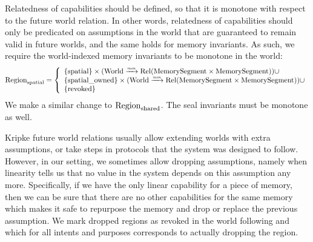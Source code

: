 \begin{jversion}
Relatedness of capabilities should be defined, so that it is monotone with respect to the future world relation.
In other words, relatedness of capabilities should only be predicated on assumptions in the world that are guaranteed to remain valid in future worlds, and the same holds for memory invariants.
As such, we require the world-indexed memory invariants to be monotone in the world:
\[
  \mathrm{Region}_\mathrm{spatial} = \left\{
  \begin{array}{l}
    \{\mathrm{spatial} \} \times (\mathrm{World} \xrightarrow{\textit{\tiny{mon}}} \mathrm{Rel}(\mathrm{MemorySegment} \times \mathrm{MemorySegment})) \cup \\
    \{\mathrm{spatial\_owned} \} \times (\mathrm{World} \xrightarrow{\textit{\tiny{mon}}} \mathrm{Rel}(\mathrm{MemorySegment} \times \mathrm{MemorySegment})) \cup \\
    \{\mathrm{revoked} \}
  \end{array} \right.
\]
We make a similar change to $\mathrm{Region}_\mathrm{shared}$. The seal invariants must be monotone as well.

Kripke future world relations usually allow extending worlds with extra assumptions, or take steps in protocols that the system was designed to follow.
However, in our setting, we sometimes allow dropping assumptions, namely when linearity tells us that no value in the system depends on this assumption any more.
Specifically, if we have the only linear capability for a piece of memory, then we can be sure that there are no other capabilities for the same memory which makes it safe to repurpose the memory and drop or replace the previous assumption.
We mark dropped regions as revoked in the world following \citet{ahmed_2004} and \citet{thamsborg_2011} which for all intents and purposes corresponds to actually dropping the region. 


\end{jversion}
